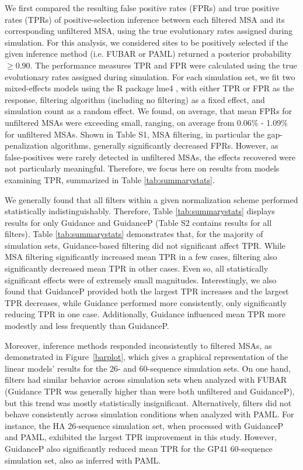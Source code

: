 \documentclass[11pt]{article}
\begin{document}
We first compared the resulting false positive rates (FPRs) and true positive rates (TPRs) of positive-selection inference between each filtered MSA and its corresponding unfiltered MSA, using the true evolutionary rates assigned during simulation. For this analysis, we considered sites to be positively selected if the given inference method (i.e. FUBAR or PAML) returned a posterior probability $\geq0.90$. The performance measures TPR and FPR were calculated using the true evolutionary rates assigned during simulation. For each simulation set, we fit two mixed-effects models using the R package lme4 \citep{Bates2012}, with either TPR or FPR as the response, filtering algorithm (including no filtering) as a fixed effect, and simulation count as a random effect.
We found, on average, that mean FPRs for unfiltered MSAs were exceeding small, ranging, on average from 0.06\% - 1.09\% for unfiltered MSAs. Shown in Table S1, MSA filtering, in particular the gap-penalization algorithms, generally significantly decreased FPRs. However, as false-positives were rarely detected in unfiltered MSAs, the effects recovered were not particularly meaningful. Therefore, we focus here on results from models examining TPR, summarized in Table \ref{tab:summarystats}.

We generally found that all filters within a given normalization scheme performed statistically indistinguishably. Therefore, Table \ref{tab:summarystats} displays results for only Guidance and GuidanceP (Table S2 contains results for all filters). Table \ref{tab:summarystats} demonstrates that, for the majority of simulation sets, Guidance-based filtering did not significant affect TPR. While MSA filtering significantly increased mean TPR in a few cases, filtering also significantly decreased mean TPR in other cases. Even so, all statistically significant effects were of extremely small magnitudes. Interestingly, we also found that GuidanceP provided both the largest TPR increases and the largest TPR decreases, while Guidance performed more consistently, only significantly reducing TPR in one case. Additionally, Guidance influenced mean TPR more modestly and less frequently than GuidanceP.

Moreover, inference methods responded inconsistently to filtered MSAs, as demonstrated in Figure~\ref{barplot}, which gives a graphical representation of the linear models' results for the 26- and 60-sequence simulation sets. On one hand, filters had similar behavior across simulation sets when analyzed with FUBAR (Guidance TPR was generally higher than were both unfiltered and GuidanceP), but this trend was mostly statistically insignificant. Alternatively, filters did not behave consistently across simulation conditions when analyzed with PAML. For instance, the HA 26-sequence simulation set, when processed with GuidanceP and PAML, exhibited the largest TPR improvement in this study. However, GuidanceP also significantly reduced mean TPR for the GP41 60-sequence simulation set, also as inferred with PAML. 
\end{document}
